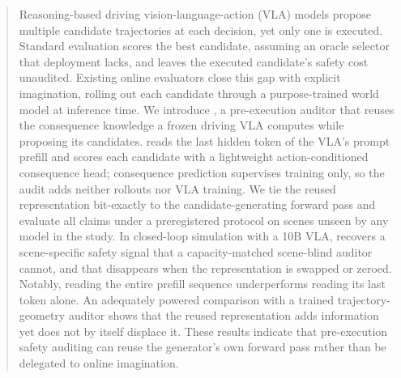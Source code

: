 \begin{abstract}
Reasoning-based driving vision-language-action (VLA) models propose multiple candidate trajectories at each decision, yet only one is executed.
Standard evaluation scores the best candidate, assuming an oracle selector that deployment lacks, and leaves the executed candidate's safety cost unaudited.
Existing online evaluators close this gap with explicit imagination, rolling out each candidate through a purpose-trained world model at inference time.
We introduce \headname{}, a pre-execution auditor that reuses the consequence knowledge a frozen driving VLA computes while proposing its candidates.
\headname{} reads the last hidden token of the VLA's prompt prefill and scores each candidate with a lightweight action-conditioned consequence head; consequence prediction supervises training only, so the audit adds neither rollouts nor VLA training.
We tie the reused representation bit-exactly to the candidate-generating forward pass and evaluate all claims under a preregistered protocol on scenes unseen by any model in the study.
In closed-loop simulation with a 10B VLA, \headname{} recovers a scene-specific safety signal that a capacity-matched scene-blind auditor cannot, and that disappears when the representation is swapped or zeroed.
Notably, reading the entire prefill sequence underperforms reading its last token alone.
An adequately powered comparison with a trained trajectory-geometry auditor shows that the reused representation adds information yet does not by itself displace it.
These results indicate that pre-execution safety auditing can reuse the generator's own forward pass rather than be delegated to online imagination.
\end{abstract}
